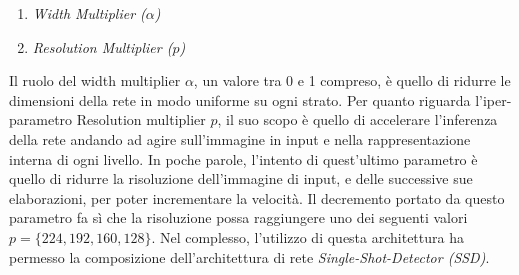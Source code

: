 \begin{enumerate}
    \item \emph{Width Multiplier ($\alpha$)}
    \item \emph{Resolution Multiplier ($p$)}
\end{enumerate}
Il ruolo del width multiplier $\alpha$, un valore tra 0 e 1 compreso, è quello di ridurre le dimensioni della rete in modo uniforme su ogni strato. Per quanto riguarda l'iper-parametro Resolution multiplier $p$,  il suo scopo è quello di accelerare l'inferenza della rete andando ad agire sull'immagine in input e nella rappresentazione interna di ogni livello. In poche parole, l'intento di quest'ultimo parametro è quello di ridurre la  risoluzione dell'immagine di input, e delle successive sue elaborazioni, per poter incrementare la velocità. Il decremento portato da questo parametro fa sì che la risoluzione possa raggiungere uno dei seguenti valori $p=\{224, 192, 160, 128\}$.
Nel complesso, l'utilizzo di questa architettura ha permesso la composizione dell'architettura di rete \emph{Single-Shot-Detector (SSD)}. 

